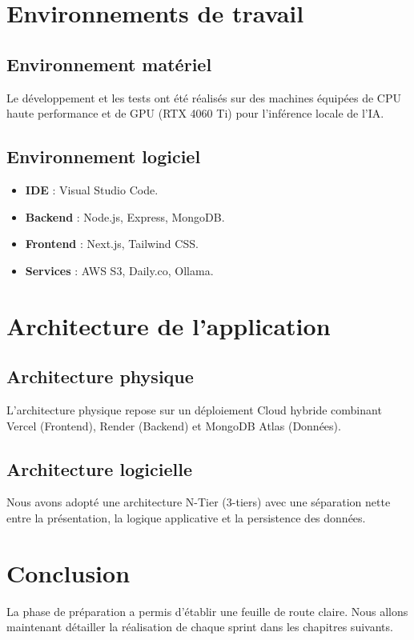 \section{Environnements de travail}
\subsection{Environnement matériel}
Le développement et les tests ont été réalisés sur des machines équipées de CPU haute performance et de GPU (RTX 4060 Ti) pour l'inférence locale de l'IA.

\subsection{Environnement logiciel}
\begin{itemize}
    \item \textbf{IDE} : Visual Studio Code.
    \item \textbf{Backend} : Node.js, Express, MongoDB.
    \item \textbf{Frontend} : Next.js, Tailwind CSS.
    \item \textbf{Services} : AWS S3, Daily.co, Ollama.
\end{itemize}

\section{Architecture de l'application}
\subsection{Architecture physique}
L'architecture physique repose sur un déploiement Cloud hybride combinant Vercel (Frontend), Render (Backend) et MongoDB Atlas (Données).

\subsection{Architecture logicielle}
Nous avons adopté une architecture N-Tier (3-tiers) avec une séparation nette entre la présentation, la logique applicative et la persistence des données.

\section{Conclusion}
La phase de préparation a permis d'établir une feuille de route claire. Nous allons maintenant détailler la réalisation de chaque sprint dans les chapitres suivants.
